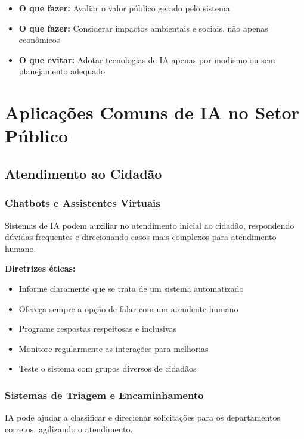 \documentclass[12pt,a4paper]{article}
\begin{document}
\begin{itemize}
    \item \textbf{O que fazer:} Avaliar o valor público gerado pelo sistema
    \item \textbf{O que fazer:} Considerar impactos ambientais e sociais, não apenas econômicos
    \item \textbf{O que evitar:} Adotar tecnologias de IA apenas por modismo ou sem planejamento adequado
\end{itemize}

\newpage
\section{Aplicações Comuns de IA no Setor Público}

\subsection{Atendimento ao Cidadão}

\subsubsection{Chatbots e Assistentes Virtuais}
Sistemas de IA podem auxiliar no atendimento inicial ao cidadão, respondendo dúvidas frequentes e direcionando casos mais complexos para atendimento humano.

\begin{tcolorbox}[highlight]
\textbf{Diretrizes éticas:}
\begin{itemize}
    \item Informe claramente que se trata de um sistema automatizado
    \item Ofereça sempre a opção de falar com um atendente humano
    \item Programe respostas respeitosas e inclusivas
    \item Monitore regularmente as interações para melhorias
    \item Teste o sistema com grupos diversos de cidadãos
\end{itemize}
\end{tcolorbox}

\subsubsection{Sistemas de Triagem e Encaminhamento}
IA pode ajudar a classificar e direcionar solicitações para os departamentos corretos, agilizando o atendimento.
\end{document}

